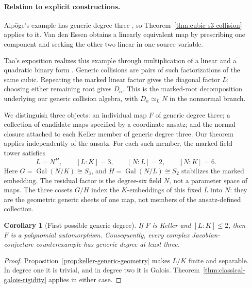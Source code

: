 \documentclass[11pt]{article}
\newtheorem{corollary}[theorem]{Corollary}
\theoremstyle{remark}
\DeclareMathOperator{\Gal}{Gal}
\begin{document}
\paragraph{Relation to explicit constructions.}
Alpöge's example has generic degree three
\cite[Theorem~3.3]{Gao2026Counterexamples}, so
Theorem~\ref{thm:cubic-s3-collision} applies to it.  Van den Essen
\cite[Sections~2--5]{VanDenEssen2026} obtains a linearly equivalent map by
prescribing one component and seeking the other two linear in one source
variable.

Tao's exposition realizes this example through multiplication of a linear
and a quadratic binary form \cite{Tao2026Digestion}.  Generic collisions
are pairs of such factorizations of the same cubic.  Repeating the marked
linear factor gives the diagonal factor \(L\); choosing either remaining
root gives \(D_\alpha\).  This is the marked-root decomposition underlying
our generic collision algebra, with \(D_\alpha\simeq_LN\) in the
nonnormal branch.

We distinguish three objects: an individual map \(F\) of generic degree
three; a collection of candidate maps specified by a coordinate ansatz;
and the normal closure attached to each Keller member of generic degree
three.  Our theorem applies independently of the ansatz.  For each such
member, the marked field tower satisfies
\[
  L=N^H,\qquad [L:K]=3,\qquad [N:L]=2,\qquad [N:K]=6.
\]
Here \(G=\Gal(N/K)\cong S_3\), and \(H=\Gal(N/L)\cong S_2\) stabilizes
the marked embedding.  The residual factor is the degree-six field \(N\),
not a parameter space of maps.  The three cosets \(G/H\) index the
\(K\)-embeddings of this fixed \(L\) into \(N\): they are the geometric
generic sheets of one map, not members of the ansatz-defined collection.

\begin{corollary}[First possible generic degree]
\label{cor:first-possible-generic-degree}
If \(F\) is Keller and \([L:K]\leq2\), then \(F\) is a polynomial
automorphism.  Consequently, every complex Jacobian-conjecture counterexample
has generic degree at least three.
\end{corollary}

\begin{proof}
Proposition~\ref{prop:keller-generic-geometry} makes \(L/K\) finite and
separable.  In degree one it is trivial, and in degree two it is Galois.
Theorem~\ref{thm:classical-galois-rigidity} applies in either case.
\end{proof}
\end{document}
